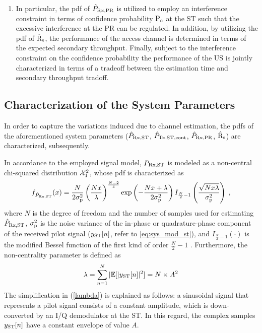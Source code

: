 \begin{enumerate}
	\item In particular, the pdf of $\hat{P}_{\text{Rx,PR}}$ is utilized to employ an interference constraint in terms of confidence probability $\text{P}_{\text{c}}$ at the ST such that the excessive interference at the PR can be regulated. In addition, by utilizing the pdf of $\hat{\text{{R}}}_{\text{s}}$, the performance of the access channel is determined in terms of the expected secondary throughput. Finally, subject to the interference constraint on the confidence probability the performance of the US is jointly characterized in terms of a tradeoff between the estimation time and secondary throughput tradoff. 
\end{enumerate}

\subsection{Characterization of the System Parameters}
In order to capture the variations induced due to channel estimation, the pdfs of the aforementioned system parameters ($\hat{P}_{\text{Rx,ST}}$, $\hat{P}_{\text{Tx,ST,cont}}$, $\hat{P}_{\text{Rx,PR}}$, $\hat{\text{{R}}}_{\text{s}}$) are characterized, subsequently. 

In accordance to the employed signal model, $P_{\text{Rx,ST}}$ is modeled as a non-central chi-squared distribution $\ncchi2$, whose pdf is characterized as \cite{Char99}
\begin{equation}
	\label{nxc2equ}
	f_{\hat{P}_{\text{Rx,ST}}} (x) = 
	\frac{N}{2\sigma_\textrm{p}^2} \left(\frac{N x}{\lambda}\right)^\frac{N-2}{4}  
	\exp\left(-\frac{N x+\lambda}{2\sigma_\textrm{p}^2}\right)  I_{\frac{N}{2}-1}\left(\frac{\sqrt{N x\lambda}}{\sigma_\textrm{p}^2}\right) \;  ,
\end{equation}
where $N$ is the degree of freedom and the number of samples used for estimating $\hat{P}_{\text{Rx,ST}}$, $\sigma^2_{\text{p}}$ is the noise variance of the in-phase or quadrature-phase component of the received pilot signal ($y_{\text{ST}}[n]$, refer to \ref{eq:sys_mod_st}), and $I_{\frac{N}{2}-1}(\cdot)$ is the modified Bessel function of the first kind of order $\frac{N}{2}-1$ \cite{Jef00}. Furthermore, the non-centrality parameter is defined as
\begin{equation}
	\label{lambda}
	\lambda = \sum_{n=1}^N |\mathbb{E}[|y_{\text{ST}}[n]|^2] = N \times A^2
\end{equation}
The simplification in (\ref{lambda}) is explained as follows: a sinusoidal signal that represents a pilot signal consists of a constant amplitude, which is down-converted by an I/Q demodulator at the ST. In this regard, the complex samples $y_{\text{ST}}[n]$ have a constant envelope of value $A$. 

